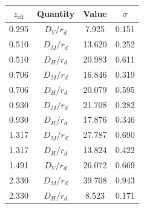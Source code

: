 \begin{tabular}{cccc}
\toprule
$z_\mathrm{eff}$ & Quantity & Value & $\sigma$ \\
\midrule
0.295 & $D_V/r_d$ & 7.925 & 0.151 \\
0.510 & $D_M/r_d$ & 13.620 & 0.252 \\
0.510 & $D_H/r_d$ & 20.983 & 0.611 \\
0.706 & $D_M/r_d$ & 16.846 & 0.319 \\
0.706 & $D_H/r_d$ & 20.079 & 0.595 \\
0.930 & $D_M/r_d$ & 21.708 & 0.282 \\
0.930 & $D_H/r_d$ & 17.876 & 0.346 \\
1.317 & $D_M/r_d$ & 27.787 & 0.690 \\
1.317 & $D_H/r_d$ & 13.824 & 0.422 \\
1.491 & $D_V/r_d$ & 26.072 & 0.669 \\
2.330 & $D_M/r_d$ & 39.708 & 0.943 \\
2.330 & $D_H/r_d$ & 8.523 & 0.171 \\
\bottomrule
\end{tabular}
